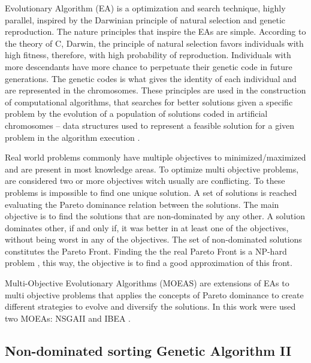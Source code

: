 \documentclass[conference]{IEEEtran}
\begin{document}
Evolutionary Algorithm (EA) is a optimization and search technique, highly parallel, inspired by the Darwinian principle of natural selection and genetic reproduction. The nature principles that inspire the EAs are simple. According to the theory of C, Darwin, the principle of natural selection favors individuals with high fitness, therefore, with high probability of reproduction. Individuals with more descendants have more chance to perpetuate their genetic code in future generations. The genetic codes is what gives the identity of each individual and are represented in the chromosomes. These principles are used in the construction of computational algorithms, that searches for better solutions given a specific problem by the evolution of a population of solutions coded in artificial chromosomes -- data structures used to represent a feasible solution for a given problem in the algorithm execution \cite{pacheco1999algoritmos}.


Real world problems commonly have multiple objectives to minimized/maximized and are present in most knowledge areas. To optimize multi objective problems, are considered two or more objectives witch usually are conflicting. To these problems is impossible to find one unique solution. A set of solutions is reached evaluating the Pareto dominance relation \cite{pareto} between the solutions. The main objective is to find the solutions that are non-dominated by any other. A solution dominates other, if and only if, it was better in at least one of the objectives, without being worst in any of the objectives. The set of non-dominated solutions constitutes the Pareto Front. Finding the the real Pareto Front is a NP-hard problem \cite{fonseca2005tutorial}, this way, the objective is to find a good approximation of this front.


Multi-Objective Evolutionary Algorithms (MOEAS) are extensions of EAs to multi objective problems that applies the concepts of Pareto dominance to create different strategies to evolve and diversify the solutions. In this work were used two MOEAs: NSGAII \cite{deb2002fast} and IBEA \cite{zitzler2004indicator}.


\subsection{Non-dominated sorting Genetic Algorithm II}
\end{document}
